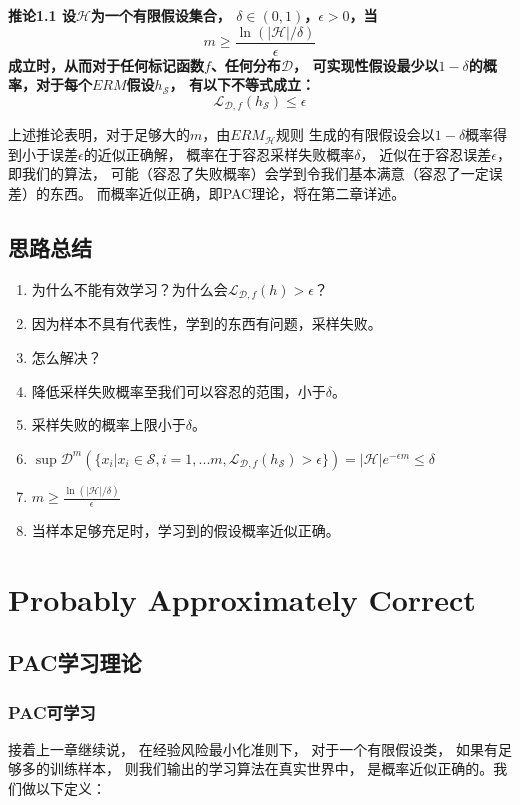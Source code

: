\documentclass[UTF8]{ctexart}
\begin{document}
\textbf{
推论1.1 设$\mathcal{H}$为一个有限假设集合，
$\delta\in(0,1)$，$\epsilon>0$，当
$$
m \geq \frac{\ln(|\mathcal{H}|/\delta)}{\epsilon}
$$
成立时，从而对于任何标记函数$f$、任何分布$\mathcal{D}$，
可实现性假设最少以$1-\delta$的概率，对于每个$ERM$假设$h_{\mathcal{S}}$，
有以下不等式成立：
$$
\mathcal{L}_{\mathcal{D},f}(h_{\mathcal{S}})\leq\epsilon
$$
}

上述推论表明，对于足够大的$m$，由${ERM}_{\mathcal{H}}$规则
生成的有限假设会以$1-\delta$概率得到小于误差$\epsilon$的近似正确解，
概率在于容忍采样失败概率$\delta$，
近似在于容忍误差$\epsilon$，
即我们的算法，
可能（容忍了失败概率）会学到令我们基本满意（容忍了一定误差）的东西。
而概率近似正确，即PAC理论，将在第二章详述。

\subsection{思路总结}
\begin{enumerate}
\item 为什么不能有效学习？为什么会$\mathcal{L}_{\mathcal{D},f}(h)>\epsilon$？
\item 因为样本不具有代表性，学到的东西有问题，采样失败。
\item 怎么解决？
\item 降低采样失败概率至我们可以容忍的范围，小于$\delta$。
\item 采样失败的概率上限小于$\delta$。
\item $\sup{\mathcal{D}^m
(\{x_i|x_i\in\mathcal{S},i=1,...m,
\mathcal{L}_{\mathcal{D},f}(h_{\mathcal{S}})>\epsilon
\})}=|\mathcal{H}|e^{-\epsilon m}\leq \delta$
\item $m \geq \frac{\ln(|\mathcal{H}|/\delta)}{\epsilon}$
\item 当样本足够充足时，学习到的假设概率近似正确。
\end{enumerate}

\newpage


%
%
\section{Probably Approximately Correct}
\subsection{PAC学习理论}
\subsubsection{PAC可学习}
接着上一章继续说，
在经验风险最小化准则下，
对于一个有限假设类，
如果有足够多的训练样本，
则我们输出的学习算法在真实世界中，
是概率近似正确的。我们做以下定义：
\end{document}
